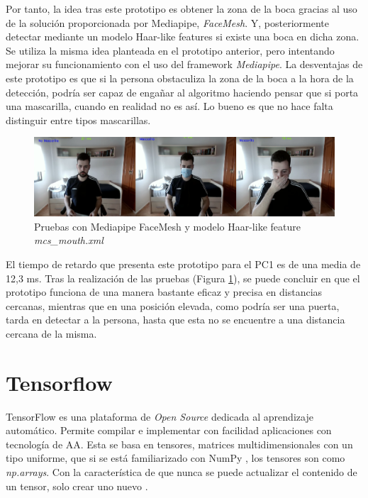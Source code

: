 Por tanto, la idea tras este prototipo es obtener la zona de la boca gracias al uso de la solución proporcionada por Mediapipe, \textit{FaceMesh}. Y, posteriormente detectar mediante un modelo Haar-like features si existe una boca en dicha zona. Se utiliza la misma idea planteada en el prototipo anterior, pero intentando mejorar su funcionamiento con el uso del framework \textit{Mediapipe}. La desventajas de este prototipo es que si la persona obstaculiza la zona de la boca a la hora de la detección, podría ser capaz de engañar al algoritmo haciendo pensar que si porta una mascarilla, cuando en realidad no es así. Lo bueno es que no hace falta distinguir entre tipos mascarillas.

\begin{figure}[htp]
	\centering
	\includegraphics[width=17cm]{imagenes/mediapipe_prueba.png}
	\caption{Pruebas con Mediapipe FaceMesh y modelo Haar-like feature \textit{mcs\_mouth.xml}}
	\label{fig:protoMediapipe}
\end{figure}

El tiempo de retardo que presenta este prototipo para el PC1 es de una media de 12,3 ms. Tras la realización de las pruebas (Figura \ref{fig:protoMediapipe}), se puede concluir en que el prototipo funciona de una manera bastante eficaz y precisa en distancias cercanas, mientras que en una posición elevada, como podría ser una puerta, tarda en detectar a la persona, hasta que esta no  se encuentre a una distancia cercana de la misma.

\newpage
\section{Tensorflow}

TensorFlow es una plataforma de \textit{Open Source} dedicada al aprendizaje automático. Permite compilar e implementar con facilidad aplicaciones con tecnología de AA. Esta se basa en tensores, matrices multidimensionales con un tipo uniforme, que si se está familiarizado con NumPy , los tensores son como \textit{np.arrays}. Con la característica de que nunca se puede actualizar el contenido de un tensor, solo crear uno nuevo \cite{tensorflow}.

